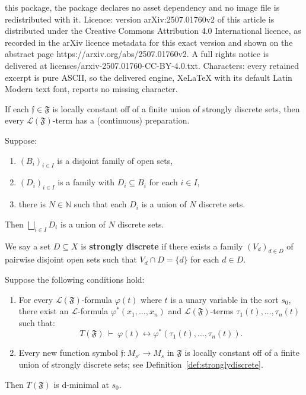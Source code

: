 \documentclass[10pt,a4paper]{amsart}
\newcommand\N{\mathbb{N}}
\newcommand\calL{\mathcal{L}}
\newcommand{\fr}{\mathfrak}
\begin{document}
this package, the package declares no asset dependency and no image file is redistributed with it. Licence: version arXiv:2507.01760v2 of this article is distributed under the Creative Commons Attribution 4.0 International licence, as recorded in the arXiv licence metadata for this exact version and shown on the abstract page https://arxiv.org/abs/2507.01760v2. A full rights notice is delivered at licenses/arxiv-2507.01760-CC-BY-4.0.txt. Characters: every retained excerpt is pure ASCII, so the delivered engine, XeLaTeX with its default Latin Modern text font, reports no missing character.
\begin{cor}\label{all_terms_preps_ms}
If each $\fr{f}\in\fr{F}$  is locally constant off of a finite union of strongly discrete sets, then every $\calL(\fr{F})$-term has a (continuous) preparation.
\end{cor}

\begin{lemma}\label{discrete_gluing_lemma}
Suppose:
\begin{enumerate}
\item $(B_i)_{i\in I}$ is a disjoint family of open sets,
\item $(D_i)_{i\in I}$ is a family with $D_i \subseteq B_i$ for each $i \in I$,
\item there is $N \in \N$ such that each $D_i$ is a union of $N$ discrete sets.
\end{enumerate}
Then $\bigsqcup_{i\in I}D_i$ is a union of $N$ discrete sets. 
\end{lemma}

\begin{definition}\label{def:stronglydiscrete}
We say a set $D\subseteq X$ is \textbf{strongly discrete} if there exists a family $(V_d)_{d\in D}$ of pairwise disjoint open sets such that $V_d\cap D=\{d\}$ for each $d\in D$.
\end{definition}

\begin{prop}\label{d-minimality_criterion_ms}
Suppose the following conditions hold:
\begin{enumerate}[label=(\Alph*)]
\item\label{conditionA} For every $\calL(\fr{F})$-formula $\varphi(t)$ where $t$ is a unary  variable in the sort $s_0$, there exist an $\calL$-formula $\varphi^*(x_1,\ldots,x_n)$ and $\calL(\fr{F})$-terms $\tau_1(t),\ldots,\tau_n(t)$ such that:
\[
T(\fr{F}) \ \vdash \ \varphi(t)\leftrightarrow \varphi^*(\tau_1(t),\ldots,\tau_n(t)).
\]
\item\label{conditionB} Every new function symbol $\fr{f}\colon M_{s'}\to M_{s}$ in $\fr{F}$ is locally constant off of a finite union of strongly discrete sets; see Definition~\ref{def:stronglydiscrete}.\end{enumerate}
Then $T(\fr{F})$ is d-minimal at $s_0$.
\end{prop}
\end{document}
